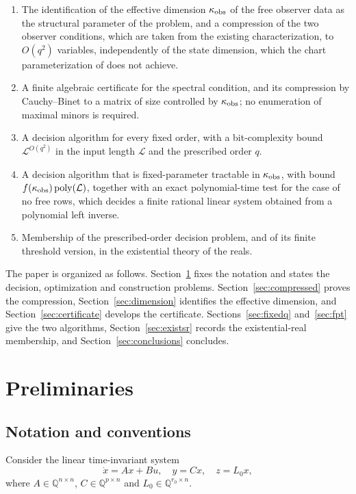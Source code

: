 \begin{enumerate}
\item The identification of the effective dimension $\kappa_{\rm obs}$ of the free
observer data as the structural parameter of the problem, and a compression of the two
observer conditions, which are taken from the existing characterization, to $O(q^2)$
variables, independently of the state dimension, which the chart parameterization of
\cite{fer26b} does not achieve.
\item A finite algebraic certificate for the spectral condition, and its compression by
Cauchy--Binet to a matrix of size controlled by $\kappa_{\rm obs}$; no enumeration of
maximal minors is required.
\item A decision algorithm for every fixed order, with a bit-complexity bound
$\mathcal L^{O(q^2)}$ in the input length $\mathcal L$ and the prescribed order $q$.
\item A decision algorithm that is fixed-parameter tractable in $\kappa_{\rm obs}$, with
bound $f(\kappa_{\rm obs})\operatorname{poly}(\mathcal L)$, together with an exact
polynomial-time test for the case of no free rows, which decides a finite rational linear
system obtained from a polynomial left inverse.
\item Membership of the prescribed-order decision problem, and of its finite threshold
version, in the existential theory of the reals.
\end{enumerate}

The paper is organized as follows. Section~\ref{sec:prelim} fixes the notation and states
the decision, optimization and construction problems. Section~\ref{sec:compressed} proves
the compression, Section~\ref{sec:dimension} identifies the effective dimension, and
Section~\ref{sec:certificate} develops the certificate. Sections~\ref{sec:fixedq}
and~\ref{sec:fpt} give the two algorithms, Section~\ref{sec:existsr} records the
existential-real membership, and Section~\ref{sec:conclusions} concludes.

\section{Preliminaries}\label{sec:prelim}

\subsection{Notation and conventions}\label{sec:notation}

Consider the linear time-invariant system
\begin{equation}\label{system}
\dot{x}=Ax+Bu,\quad y=Cx,\quad z=L_0x,
\end{equation}
where $A\in\mathbb Q^{n\times n}$, $C\in\mathbb Q^{p\times n}$ and
$L_0\in\mathbb Q^{r_0\times n}$.

